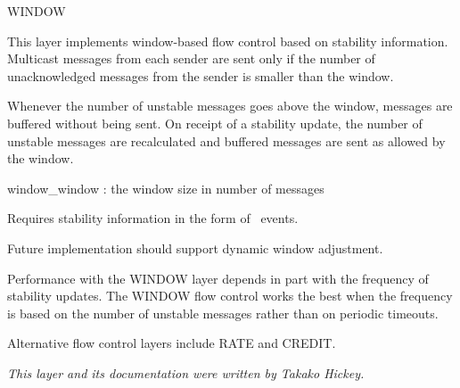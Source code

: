 \begin{Layer}{WINDOW} 

This layer implements window-based flow control based on stability information.
Multicast messages from each sender are sent only if the number of
unacknowledged messages from the sender is smaller than the window.

\begin{Protocol}
Whenever the number of unstable messages goes above the window, messages
are buffered without being sent.  On receipt of a stability update, the
number of unstable messages are recalculated and buffered messages are sent
as allowed by the window.
\end{Protocol}

\begin{Parameters}
\item window\_window : the window size in number of messages
\end{Parameters}

\begin{Properties}
\item
Requires stability information in the form of \UpStable\ events.
\end{Properties}

\begin{Notes}
\item 
Future implementation should support dynamic window adjustment.
\item 
Performance with the WINDOW layer depends in part with the frequency of
stability updates.  The WINDOW flow control works the best when the
frequency is based on the number of unstable messages rather than on
periodic timeouts.
\item 
Alternative flow control layers include RATE and CREDIT.
\end{Notes}

\begin{Sources}
\end{Sources}

\emph{This layer and its documentation were written by Takako Hickey.}
\end{Layer}
